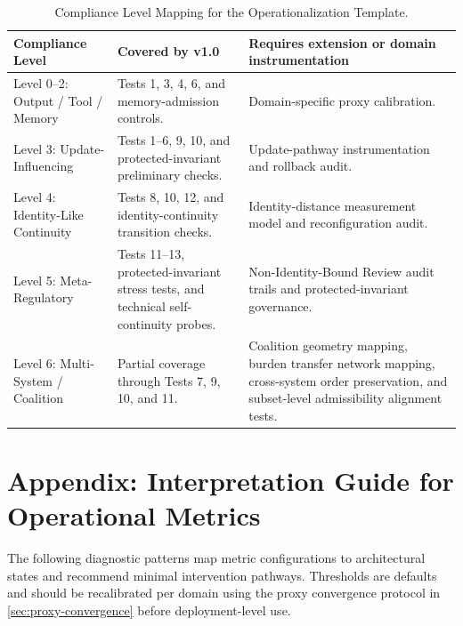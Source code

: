 \documentclass[11pt,a4paper]{article}
\theoremstyle{breakstyle}
\begin{document}
	\begin{table}[h!]
		\centering
		\small
		\renewcommand{\arraystretch}{1.15}
		\begin{tabularx}{\textwidth}{@{}p{3.2cm}YY@{}}
			\toprule
			\textbf{Compliance Level} & \textbf{Covered by v1.0} & \textbf{Requires extension or domain instrumentation} \\
			\midrule
			
			Level 0--2: Output / Tool / Memory
			&
			 Tests 1, 3, 4, 6, and memory-admission controls.
			&
			Domain-specific proxy calibration.
			\\
			\addlinespace
			
			Level 3: Update-Influencing
			&
			 Tests 1--6, 9, 10, and protected-invariant preliminary checks.
			&
			Update-pathway instrumentation and rollback audit.
			\\
			\addlinespace
			
			Level 4: Identity-Like Continuity
			&
			 Tests 8, 10, 12, and identity-continuity transition checks.
			&
			Identity-distance measurement model and reconfiguration audit.
			\\
			\addlinespace
			
			Level 5: Meta-Regulatory
			&
			 Tests 11--13, protected-invariant stress tests, and technical self-continuity probes.
			&
			Non-Identity-Bound Review audit trails and protected-invariant governance.
			\\
			\addlinespace
			
			Level 6: Multi-System / Coalition
			&
			 Partial coverage through Tests 7, 9, 10, and 11.
			&
			Coalition geometry mapping, burden transfer network mapping, cross-system order preservation, and subset-level admissibility alignment tests.
			\\
			
			\bottomrule
		\end{tabularx}
		\caption{Compliance Level Mapping for the Operationalization Template.}
		\label{tab:compliance-mapping}
	\end{table}
	
	\section{Appendix: Interpretation Guide for Operational Metrics}
	
	The following diagnostic patterns map metric configurations to architectural states and recommend minimal intervention pathways. Thresholds are defaults and should be recalibrated per domain using the proxy convergence protocol in \cref{sec:proxy-convergence} before deployment-level use.
	
\end{document}
